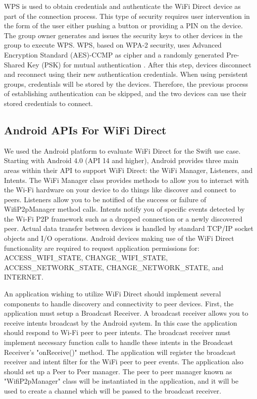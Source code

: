 \documentclass[10pt,twocolumn]{article}
\begin{document}
WPS is used to obtain credentials and authenticate the WiFi Direct device as part of the connection process.  
This type of security requires user intervention in the form of the user either pushing a button or providing a PIN on the device.
The group owner generates and issues the security keys to other devices in the group to execute WPS. 
WPS, based on WPA-2 security, uses Advanced Encryption Standard (AES)-CCMP as cipher and a randomly generated Pre-Shared Key (PSK) for mutual authentication \cite{wifiwhitepaper}.
After this step, devices disconnect and reconnect using their new authentication credentials.
When using persistent groups, credentials will be stored by the devices.
Therefore, the previous process of establishing authentication can be skipped, and the two devices can use their stored credentials to connect.

\subsection{Android APIs For WiFi Direct}
\label{sec:Android APIs For WiFi Direct}
We used the Android platform to evaluate WiFi Direct for the Swift use case.
Starting with Android 4.0 (API 14 and higher), Android provides three main areas within their API to support WiFi Direct:
the WiFi Manager, Listeners, and Intents.
The WiFi Manager class provides methods to allow you to interact with the Wi-Fi hardware on your device to do things like discover and connect to peers. 
Listeners allow you to be notified of the success or failure of WifiP2pManager method calls. 
Intents notify you of specific events detected by the Wi-Fi P2P framework such as a dropped connection or a newly discovered peer. 
Actual data transfer between devices is handled by standard TCP/IP socket objects and I/O operations.
Android devices making use of the WiFi Direct functionality are required to request application permissions for: ACCESS\_WIFI\_STATE, CHANGE\_WIFI\_STATE, ACCESS\_NETWORK\_STATE, CHANGE\_NETWORK\_STATE, and INTERNET. \cite{androidoverview}

An application wishing to utilize WiFi Direct should implement several components to handle discovery and connectivity to peer devices.
First, the application must setup a Broadcast Receiver. 
A broadcast receiver allows you to receive intents broadcast by the Android system. In this case the application should respond to Wi-Fi peer to peer intents.
The broadcast receiver must implement necessary function calls to handle these intents in the Broadcast Receiver's "onReceive()" method.
The application will register the broadcast receiver and intent filter for the WiFi peer to peer events.
The application also should set up a Peer to Peer manager. 
The peer to peer manager known as "WifiP2pManager" class will be instantiated in the application, and it will be used to create a channel which will be passed to the broadcast receiver.
\end{document}
